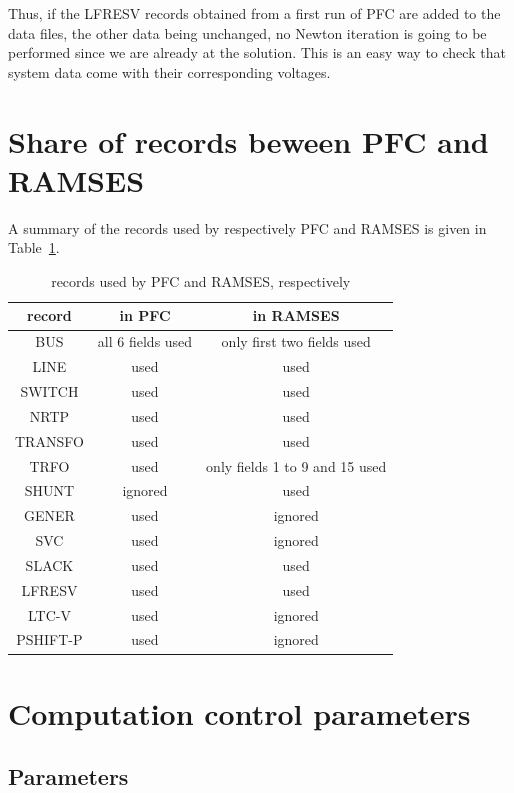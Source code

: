 Thus, if the LFRESV records obtained from a first run of PFC are added to the data files, the other data being unchanged, no Newton iteration is going to be performed since we are already at the solution. This is an easy way to check that system data come with their corresponding voltages.


\section{Share of records beween PFC and RAMSES}

A summary of the records used by respectively PFC and RAMSES is given in Table~\ref{tab-records}.

\begin{table}[h!]
\centering
\caption{records used by PFC and RAMSES, respectively}\label{tab-records}
\begin{tabular}{|c|c|c|}
\hline
record & in PFC & in RAMSES \\ \hline \hline
BUS & all 6 fields used & only first two fields used \\ \hline
LINE & used & used \\ \hline
SWITCH & used & used \\ \hline
NRTP & used & used \\ \hline
TRANSFO & used & used \\ \hline
TRFO & used & only fields 1 to 9 and 15 used \\ \hline
SHUNT & ignored & used \\ \hline
GENER &  used & ignored \\ \hline
SVC & used & ignored \\ \hline
SLACK & used & used \\ \hline
LFRESV & used & used \\ \hline
LTC-V & used & ignored \\ \hline
PSHIFT-P & used & ignored \\ \hline
\end{tabular}
\end{table}


\section{Computation control parameters}\label{sec-pfc-ctl}

\subsection{Parameters}

